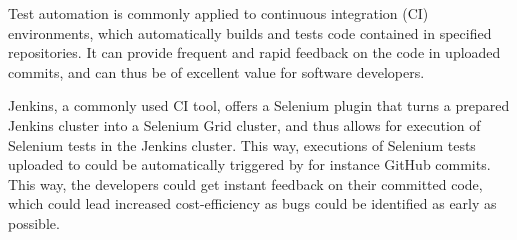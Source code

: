 Test automation is commonly applied to continuous integration (CI) \cite{ci} environments, which automatically builds and tests code contained in specified repositories. It can provide frequent and rapid feedback on the code in uploaded commits, and can thus be of excellent value for software developers.

Jenkins, a commonly used CI tool, offers a Selenium plugin \cite{jenkins-selenium} that turns a prepared Jenkins cluster into a Selenium Grid cluster, and thus allows for execution of Selenium tests in the Jenkins cluster. This way, executions of Selenium tests uploaded to \toolname \space could be automatically triggered by for instance GitHub commits. This way, the developers could get instant feedback on their committed code, which could lead increased cost-efficiency as bugs could be identified as early as possible.